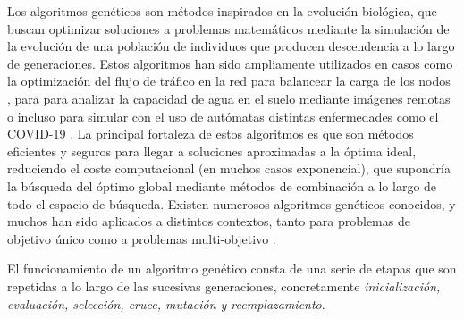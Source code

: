 \documentclass{uathesis-es}
\begin{document}
Los algoritmos genéticos son métodos inspirados en la evolución biológica, que buscan optimizar soluciones a problemas matemáticos mediante la simulación de la evolución de una población de individuos que producen descendencia a lo largo de generaciones. Estos algoritmos han sido ampliamente utilizados en casos como la optimización del flujo de tráfico en la red para balancear la carga de los nodos \cite{5483775}, para para analizar la capacidad de agua en el suelo mediante imágenes remotas \cite{PACHEPSKY1998213} o incluso para simular con el uso de autómatas distintas enfermedades como el COVID-19 \cite{GHOSH2020106692}. La principal fortaleza de estos algoritmos es que son métodos eficientes y seguros para llegar a soluciones aproximadas a la óptima ideal, reduciendo el coste computacional (en muchos casos exponencial), que supondría la búsqueda del óptimo global mediante métodos de combinación a lo largo de todo el espacio de búsqueda. Existen numerosos algoritmos genéticos conocidos, y muchos han sido aplicados a distintos contextos, tanto para problemas de objetivo único como a problemas multi-objetivo \cite{wang2020comparative}.

El funcionamiento de un algoritmo genético consta de una serie de etapas que son repetidas a lo largo de las sucesivas generaciones, concretamente \textit{inicialización, evaluación, selección, cruce, mutación y reemplazamiento}.
\end{document}
